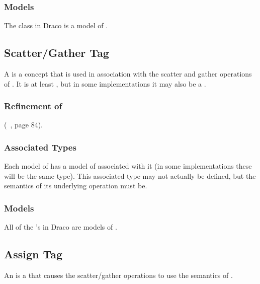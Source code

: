 \documentclass[11pt]{rnote}
\begin{document}
\subsubsection{Models}

The  class in Draco is a model of
.

\newpage

\subsection{Scatter/Gather Tag}
\label{sec:scatter gather tag}

A  is a concept that is used in
association with the scatter and gather operations of . It is at least , but in
some implementations it may also be a .

\subsubsection{Refinement of}
 (~\cite{au99}, page 84).

\subsubsection{Associated Types}

Each model of  has a model of
 associated with it (in some implementations these
will be the same type). This associated type may not actually be
defined, but the semantics of its underlying operation must be.

\subsubsection{Models}

All of the  's in Draco are
models of .

\bigskip

\subsection{Assign Tag}

An  is a  that causes
the  scatter/gather operations to use the
semantics of .
\end{document}
